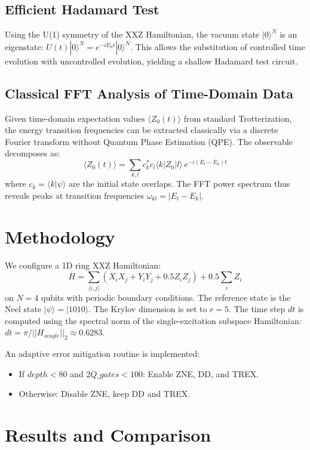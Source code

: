 \documentclass[11pt,a4paper]{article}
\begin{document}
\subsection{Efficient Hadamard Test}
Using the U(1) symmetry of the XXZ Hamiltonian, the vacuum state $|0\rangle^N$ is an eigenstate: $U(t)|0\rangle^N = e^{-i E_0 t}|0\rangle^N$. This allows the substitution of controlled time evolution with uncontrolled evolution, yielding a shallow Hadamard test circuit.

\subsection{Classical FFT Analysis of Time-Domain Data}
Given time-domain expectation values $\langle Z_0(t) \rangle$ from standard Trotterization, the energy transition frequencies can be extracted classically via a discrete Fourier transform without Quantum Phase Estimation (QPE). The observable decomposes as:
\begin{equation}
\langle Z_0(t) \rangle = \sum_{k,l} c_k^* c_l \langle k | Z_0 | l \rangle \, e^{-i(E_l - E_k)t}
\end{equation}
where $c_k = \langle k | \psi \rangle$ are the initial state overlaps. The FFT power spectrum thus reveals peaks at transition frequencies $\omega_{kl} = |E_l - E_k|$.

\section{Methodology}
We configure a 1D ring XXZ Hamiltonian:
\begin{equation}
H = \sum_{\langle i,j \rangle} (X_i X_j + Y_i Y_j + 0.5 Z_i Z_j) + 0.5 \sum_i Z_i
\end{equation}
on $N=4$ qubits with periodic boundary conditions. The reference state is the Neel state $|\psi\rangle = |1010\rangle$.
The Krylov dimension is set to $r=5$. The time step $dt$ is computed using the spectral norm of the single-excitation subspace Hamiltonian: $dt = \pi / ||H_{single}||_2 \approx 0.6283$.

An adaptive error mitigation routine is implemented:
\begin{itemize}
    \item If $depth < 80$ and $2Q\_gates < 100$: Enable ZNE, DD, and TREX.
    \item Otherwise: Disable ZNE, keep DD and TREX.
\end{itemize}

\section{Results and Comparison}
\end{document}
